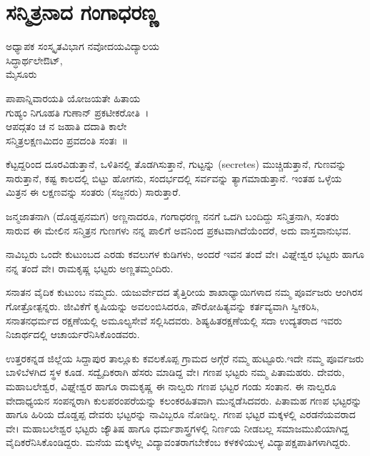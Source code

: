 {\fontsize{14}{16}\selectfont
\chapter{ಸನ್ಮಿತ್ರನಾದ ಗಂಗಾಧರಣ್ಣ}

\begin{center}
\smallskip
ಅಧ್ಯಾಪಕ \enginline{-} ಸಂಸ್ಕೃತವಿಭಾಗ
ನವೋದಯವಿದ್ಯಾಲಯ\\
ಸಿದ್ಧಾರ್ಥಲೇಔಟ್,\\ 
ಮೈಸೂರು
\addrule
\end{center}

\begin{center}
ಪಾಪಾನ್ನಿವಾರಯತಿ ಯೋಜಯತೇ ಹಿತಾಯ\\
ಗುಹ್ಯಂ ನಿಗೂಹತಿ ಗುಣಾನ್ ಪ್ರಕಟೀಕರೋತಿ~।\\
ಆಪದ್ಗತಂ ಚ ನ ಜಹಾತಿ ದದಾತಿ ಕಾಲೇ\\
ಸನ್ಮಿತ್ರಲಕ್ಷಣಮಿದಂ ಪ್ರವದಂತಿ ಸಂತಃ~॥
\end{center}
ಕೆಟ್ಟದ್ದರಿಂದ ದೂರವಿಡುತ್ತಾನೆ, ಒಳಿತಿನಲ್ಲಿ ತೊಡಗಿಸುತ್ತಾನೆ, ಗುಟ್ಟನ್ನು (secretes) ಮುಚ್ಚಿಡುತ್ತಾನೆ, ಗುಣವನ್ನು ಸಾರುತ್ತಾನೆ, ಕಷ್ಟ ಕಾಲದಲ್ಲಿ ಬಿಟ್ಟು ಹೋಗನು, ಸಂದರ್ಭದಲ್ಲಿ ಸರ್ವವನ್ನು ತ್ಯಾಗಮಾಡುತ್ತಾನೆ. ಇಂತಹ ಒಳ್ಳೆಯ ಮಿತ್ರನ ಈ ಲಕ್ಷಣವನ್ನು ಸಂತರು (ಸಜ್ಜನರು) ಸಾರುತ್ತಾರೆ. 

ಜನ್ಮಜಾತನಾಗಿ (ದೊಡ್ಡಪ್ಪನಮಗ) ಅಣ್ಣನಾದರೂ, ಗಂಗಾಧರಣ್ಣ ನನಗೆ ಒದಗಿ ಬಂದಿದ್ದು ಸನ್ಮಿತ್ರನಾಗಿ, ಸಂತರು ಸಾರುವ ಈ ಮೇಲಿನ ಸನ್ಮಿತ್ರನ ಗುಣಗಳು ನನ್ನ ಪಾಲಿಗೆ ಅವನಿಂದ ಪ್ರಕಟವಾಗಿದೆಯೆಂದರೆ, ಅದು ವಾಸ್ತವಾನುಭವ.

ನಾವಿಬ್ಬರು ಒಂದೇ ಕುಟುಂಬದ ಎರಡು ಕವಲುಗಳ ಕುಡಿಗಳು, ಅಂದರೆ ಇವನ ತಂದೆ ವೇ। ವಿಘ್ನೇಶ್ವರ ಭಟ್ಟರು ಹಾಗೂ ನನ್ನ ತಂದೆ ವೇ। ರಾಮಕೃಷ್ಣ ಭಟ್ಟರು ಅಣ್ಣತಮ್ಮಂದಿರು.

ಸನಾತನ ವೈದಿಕ ಕುಟುಂಬ ನಮ್ಮದು. ಯಜುರ್ವೇದದ  ತೈತ್ತಿರೀಯ ಶಾಖಾಧ್ಯಾಯಿಗಳಾದ ನಮ್ಮ  ಪೂರ್ವಜರು ಆಂಗಿರಸ ಗೋತ್ರೋತ್ಪನ್ನರು. ಜೀವಿಕೆಗೆ ಕೃಷಿಯನ್ನು ಅವಲಂಬಿಸಿದರೂ, ಪೌರೋಹಿತ್ಯವನ್ನು ಕರ್ತವ್ಯವಾಗಿ ಸ್ವೀಕರಿಸಿ, ಸನಾತನಧರ್ಮದ ರಕ್ಷಣೆಯಲ್ಲಿ ಅಮೂಲ್ಯಸೇವೆ ಸಲ್ಲಿಸಿದವರು. ಶಿಷ್ಯಹಿತರಕ್ಷಣೆಯಲ್ಲಿ  ಸದಾ ಉದ್ಯತರಾದ ಇವರು ನಿಜಾರ್ಥದಲ್ಲಿ ಆಚಾರ್ಯರೆನಿಸಿಕೊಂಡವರು. 

ಉತ್ತರಕನ್ನಡ ಜಿಲ್ಲೆಯ ಸಿದ್ದಾಪುರ ತಾಲ್ಲೂಕು ಕವಲಕೊಪ್ಪ ಗ್ರಾಮದ ಅಗ್ಗೆರೆ ನಮ್ಮ ಹುಟ್ಟೂರು.ಇದೇ ನಮ್ಮ ಪೂರ್ವಜರು ಬಾಳಿಬೆಳಗಿದ ಸ್ಥಳ ಕೂಡ. ಸದ್ವೈದಿಕರಾಗಿ ಹೆಸರು ಮಾಡಿದ್ದ ವೇ। ಗಣಪ ಭಟ್ಟರು ನಮ್ಮ  ಪಿತಾಮಹರು. ದೇವರು, ಮಹಾಬಲೇಶ್ವರ, ವಿಘ್ನೇಶ್ವರ ಹಾಗೂ ರಾಮಕೃಷ್ಣ ಈ ನಾಲ್ವರು ಗಣಪ ಭಟ್ಟರ ಗಂಡು ಸಂತಾನ. ಈ ನಾಲ್ವರೂ ವೇದಾಧ್ಯಯನ ಸಂಪನ್ನರಾಗಿ ಕುಲಪರಂಪರೆಯನ್ನು ಕಲಂಕರಹಿತವಾಗಿ ಮುನ್ನಡೆಸಿದವರು. ಪಿತಾಮಹ ಗಣಪ ಭಟ್ಟರನ್ನು ಹಾಗೂ ಹಿರಿಯ ದೊಡ್ಡಪ್ಪ ದೇವರು ಭಟ್ಟರನ್ನು ನಾವಿಬ್ಬರೂ ನೋಡಿಲ್ಲ. ಗಣಪ ಭಟ್ಟರ ಮಕ್ಕಳಲ್ಲಿ ಎರಡನೆಯವರಾದ ವೇ। ಮಹಾಬಲೇಶ್ವರ ಭಟ್ಟರು ಜ್ಯೌತಿಷ ಹಾಗೂ ಧರ್ಮಶಾಸ್ತ್ರಗಳಲ್ಲಿ ನಿರ್ಣಯ ನೀಡಬಲ್ಲ ಸಮಾಜಮುಖಿಯಾಗಿದ್ದ ವೈದಿಕರೆನಿಸಿಕೊಂಡಿದ್ದರು. ಮನೆಯ ಮಕ್ಕಳೆಲ್ಲ ವಿದ್ಯಾವಂತರಾಗಬೇಕೆಂಬ ಕಳಕಳಿಯುಳ್ಳ ವಿದ್ಯಾಪಕ್ಷಪಾತಿಗಳಾಗಿದ್ದರು.

}
